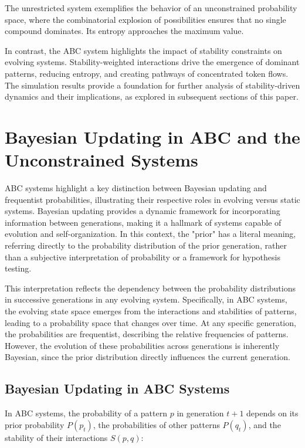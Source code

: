 \documentclass[entropy,article,submit,pdftex,oneauthor]{Definitions/mdpi}
\begin{document}
The unrestricted system exemplifies the behavior of an unconstrained probability space, where the combinatorial explosion of possibilities ensures that no single compound dominates. Its entropy approaches the maximum value.

In contrast, the ABC system highlights the impact of stability constraints on evolving systems. Stability-weighted interactions drive the emergence of dominant patterns, reducing entropy, and creating pathways of concentrated token flows. The simulation results provide a foundation for further analysis of stability-driven dynamics and their implications, as explored in subsequent sections of this paper.

\section{Bayesian Updating in ABC and the Unconstrained Systems}

ABC systems highlight a key distinction between Bayesian \cite{mcgrayne2011theory} updating and frequentist probabilities, illustrating their respective roles in evolving versus static systems. Bayesian updating provides a dynamic framework for incorporating information between generations, making it a hallmark of systems capable of evolution and self-organization. In this context, the "prior" has a literal meaning, referring directly to the probability distribution of the prior generation, rather than a subjective interpretation of probability or a framework for hypothesis testing.

This interpretation reflects the dependency between the probability distributions in successive generations in any evolving system. Specifically, in ABC systems, the evolving state space emerges from the interactions and stabilities of patterns, leading to a probability space that changes over time. At any specific generation, the probabilities are frequentist, describing the relative frequencies of patterns. However, the evolution of these probabilities across generations is inherently Bayesian, since the prior distribution directly influences the current generation.

\subsection{Bayesian Updating in ABC Systems}

In ABC systems, the probability of a pattern \( p \) in generation \( t+1 \) depends on its prior probability \( P(p_t) \), the probabilities of other patterns \( P(q_t) \), and the stability of their interactions \( S(p, q) \):
\end{document}
